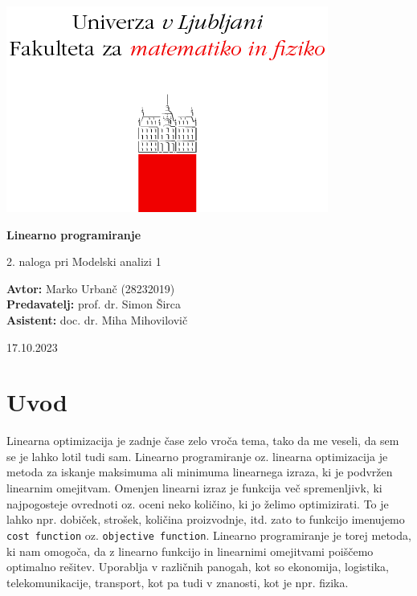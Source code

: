 \documentclass[a4paper]{article}
\begin{document}
\begin{titlepage}
    \begin{center}
        \includegraphics[]{logo.png}
        \vspace*{3cm}
        
        \Huge
        \textbf{Linearno programiranje}
        
        \vspace{0.5cm}
        \large
        2. naloga pri Modelski analizi 1

        \vspace{4.5cm}
        
        \textbf{Avtor:} Marko Urbanč (28232019)\ \\
        \textbf{Predavatelj:} prof. dr. Simon Širca\ \\
        \textbf{Asistent:} doc. dr. Miha Mihovilovič\ \\
        
        \vspace{2.8cm}
        
        \large
        17.10.2023
    \end{center}
\end{titlepage}
\tableofcontents
\newpage
\section{Uvod}
Linearna optimizacija je zadnje čase zelo vroča tema, tako da me veseli, da sem se je lahko lotil tudi sam. 
Linearno programiranje oz. linearna optimizacija je metoda za iskanje maksimuma ali minimuma linearnega izraza,
ki je podvržen linearnim omejitvam. Omenjen linearni izraz je funkcija več spremenljivk, ki najpogosteje ovrednoti
oz. oceni neko količino, ki jo želimo optimizirati. To je lahko npr. dobiček, strošek, količina proizvodnje, itd.
zato to funkcijo imenujemo \texttt{cost function} oz. \texttt{objective function}. Linearno programiranje je torej
metoda, ki nam omogoča, da z linearno funkcijo in linearnimi omejitvami poiščemo optimalno rešitev. Uporablja v 
različnih panogah, kot so ekonomija, logistika, telekomunikacije, transport, kot pa tudi v znanosti, kot je npr. 
fizika. \\
\end{document}
